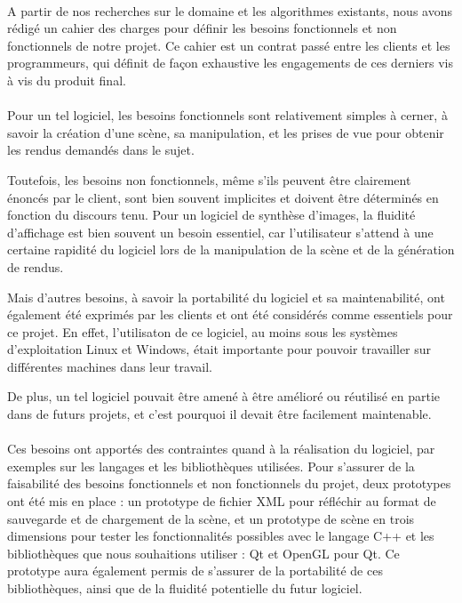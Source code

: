 \paragraph{}
        A partir de nos recherches sur le domaine et les algorithmes existants, nous avons rédigé un cahier des charges pour définir les besoins fonctionnels et non fonctionnels de notre projet. Ce cahier est un contrat passé entre les clients et les programmeurs, qui définit de façon exhaustive les engagements de ces derniers vis à vis du produit final.
\paragraph{}
        Pour un tel logiciel, les besoins fonctionnels sont relativement simples à cerner, à savoir la création d'une scène, sa manipulation, et les prises de vue pour obtenir les rendus demandés dans le sujet. 
        
        Toutefois, les besoins non fonctionnels, même s'ils peuvent être clairement énoncés par le client, sont bien souvent implicites et doivent être déterminés en fonction du discours tenu. Pour un logiciel de synthèse d'images, la fluidité d'affichage est bien souvent un besoin essentiel, car l'utilisateur s'attend à une certaine rapidité du logiciel lors de la manipulation de la scène et de la génération de rendus. 
        
        Mais d'autres besoins, à savoir la portabilité du logiciel et sa maintenabilité, ont également été exprimés par les clients et ont été considérés comme essentiels pour ce projet. En effet, l'utilisaton de ce logiciel, au moins sous les systèmes d'exploitation Linux et Windows, était importante pour pouvoir travailler sur différentes machines dans leur travail. 
        
        De plus, un tel logiciel pouvait être amené à être amélioré ou réutilisé en partie dans de futurs projets, et c'est pourquoi il devait être facilement maintenable.

\paragraph{}
        Ces besoins ont apportés des contraintes quand à la réalisation du logiciel, par exemples sur les langages et les bibliothèques utilisées.
        Pour s'assurer de la faisabilité des besoins fonctionnels et non fonctionnels du projet, deux prototypes ont été mis en place : un prototype de fichier XML pour réfléchir au format de sauvegarde et de chargement de la scène, et un prototype de scène en trois dimensions pour tester les fonctionnalités possibles avec le langage C++ et les bibliothèques que nous souhaitions utiliser : Qt et OpenGL pour Qt. Ce prototype aura également permis de s'assurer de la portabilité de ces bibliothèques, ainsi que de la fluidité potentielle du futur logiciel.

